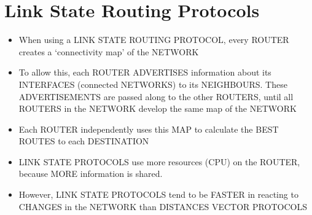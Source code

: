 \section{Link State Routing
Protocols}\label{link-state-routing-protocols}

\begin{itemize}
\tightlist
\item
  When using a LINK STATE ROUTING PROTOCOL, every ROUTER creates a
  `connectivity map' of the NETWORK
\item
  To allow this, each ROUTER ADVERTISES information about its INTERFACES
  (connected NETWORKS) to its NEIGHBOURS. These ADVERTISEMENTS are
  passed along to the other ROUTERS, until all ROUTERS in the NETWORK
  develop the same map of the NETWORK
\item
  Each ROUTER independently uses this MAP to calculate the BEST ROUTES
  to each DESTINATION
\item
  LINK STATE PROTOCOLS use more resources (CPU) on the ROUTER, because
  MORE information is shared.
\item
  However, LINK STATE PROTOCOLS tend to be FASTER in reacting to CHANGES
  in the NETWORK than DISTANCES VECTOR PROTOCOLS
\end{itemize}
